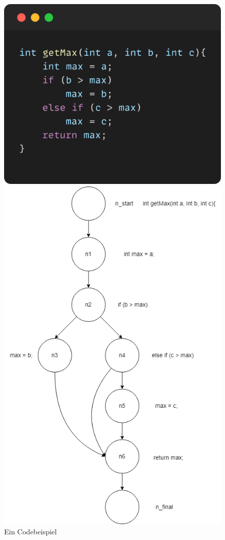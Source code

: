 \documentclass[	%
		fontsize=11pt,  %
		a4paper,	    %
		ngerman,		%
		sans,			%
		f4,				%
	]{HsH-report}		%
\begin{document}
\begin{figure}
	\centering
	\begin{minipage}{0.49\textwidth}
		\centering
		\includegraphics[width=1\textwidth]{getMax_Bsp.png}
		\caption{Ein Codebeispiel}
	\end{minipage}\hfill
	\begin{minipage}{0.49\textwidth}
		\centering
		\includegraphics[width=1\textwidth]{Zweig_Dia.png}

\end{minipage}
\end{figure}
\end{document}
